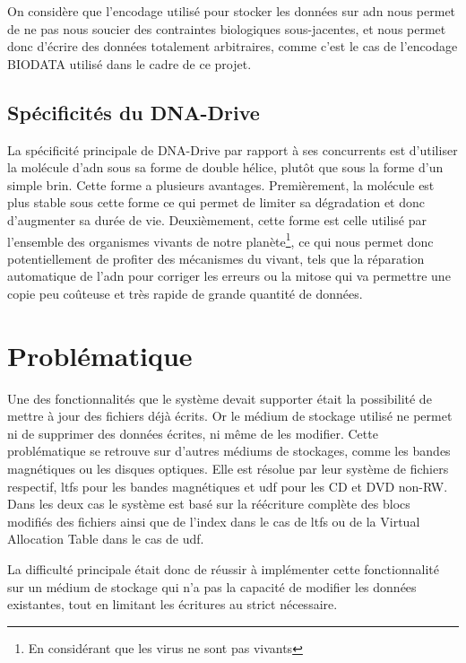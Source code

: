 \documentclass[a4paper]{report}
\begin{document}
On considère que l'encodage utilisé pour stocker les données sur \ac{adn} nous permet de ne pas nous soucier des contraintes biologiques sous-jacentes, et nous permet donc d'écrire des données totalement arbitraires, comme c'est le cas de l'encodage BIODATA utilisé dans le cadre de ce projet.

\subsection{Spécificités du DNA-Drive}

La spécificité principale de DNA-Drive par rapport à ses concurrents est d'utiliser la molécule d'\ac{adn} sous sa forme de double hélice, plutôt que sous la forme d'un simple brin.
Cette forme a plusieurs avantages.
Premièrement, la molécule est plus stable sous cette forme ce qui permet de limiter sa dégradation et donc d'augmenter sa durée de vie.
Deuxièmement, cette forme est celle utilisé par l'ensemble des organismes vivants de notre planète\footnote{En considérant que les virus ne sont pas vivants},
ce qui nous permet donc potentiellement de profiter des mécanismes du vivant,
tels que la réparation automatique de l’\ac{adn} pour corriger les erreurs
ou la mitose qui va permettre une copie peu coûteuse et très rapide de grande quantité de données.

\section{Problématique}

Une des fonctionnalités que le système devait supporter était la possibilité de mettre à jour des fichiers déjà écrits.
Or le médium de stockage utilisé ne permet ni de supprimer des données écrites, ni même de les modifier.
Cette problématique se retrouve sur d'autres médiums de stockages, comme les bandes magnétiques ou les disques optiques.
Elle est résolue par leur système de fichiers respectif, \ac{ltfs} \cite{pease2010linear} pour les bandes magnétiques et \ac{udf} \cite{optical2003universal} pour les CD et DVD non-RW.
Dans les deux cas le système est basé sur la réécriture complète des blocs modifiés des fichiers ainsi que de l'index dans le cas de \ac{ltfs} ou de la Virtual Allocation Table dans le cas de \ac{udf}.


La difficulté principale était donc de réussir à implémenter cette fonctionnalité sur un médium de stockage qui n'a pas la capacité de modifier les données existantes, tout en limitant les écritures au strict nécessaire.
\end{document}
